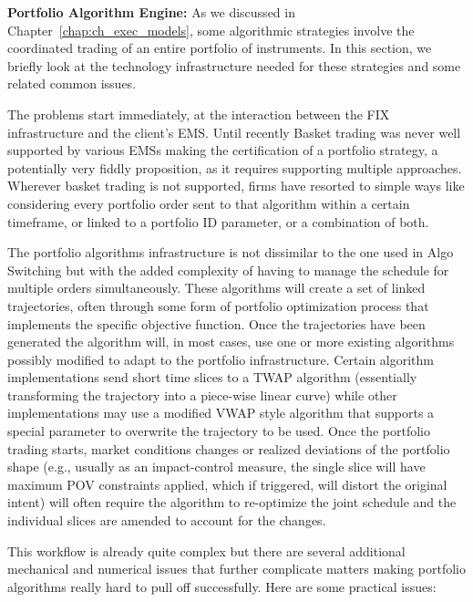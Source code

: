 \noindent\textbf{Portfolio Algorithm Engine:} As we discussed in Chapter~\ref{chap:ch_exec_models}, some algorithmic strategies involve the coordinated trading of an entire portfolio of instruments. In this section, we briefly look at the technology infrastructure needed for these strategies and some related common issues. 


The problems start immediately, at the interaction between the FIX infrastructure and the client's EMS. Until recently Basket trading was never well supported by various EMSs making the certification of a portfolio strategy, a potentially very fiddly proposition, as it requires supporting multiple approaches. Wherever basket trading is not supported, firms have resorted to simple ways like considering every portfolio order sent to that algorithm within a certain timeframe, or linked to a portfolio ID parameter, or a combination of both.


The portfolio algorithms infrastructure is not dissimilar to the one used in Algo Switching but with the added complexity  of having to manage the schedule for multiple orders simultaneously. These algorithms will create a set of linked trajectories, often through some form of portfolio optimization process that implements the specific objective function. Once the trajectories have been generated the algorithm will, in most cases, use one or more existing algorithms possibly modified to adapt to the portfolio infrastructure.  Certain algorithm implementations send short time slices to a TWAP algorithm (essentially transforming the trajectory into a piece-wise linear curve) while other implementations may use a modified VWAP style algorithm that supports a special parameter to overwrite the trajectory to be used. Once the portfolio trading starts, market conditions changes or realized deviations of the portfolio shape (e.g., usually as an impact-control measure, the single slice will have maximum POV constraints applied, which if triggered, will distort the original intent) will often require the algorithm to re-optimize the joint schedule and the individual slices are amended to account for the changes.


This workflow is already quite complex but there are several additional mechanical and numerical issues that further complicate matters making portfolio algorithms really hard to pull off successfully. Here are some practical issues:

